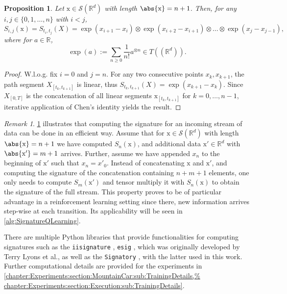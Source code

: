 \documentclass[
    a4paper,
    11pt,
    bibliography=totoc,
    listof=totoc,      
    headinclude=true,
    cleardoublepage=empty,
]{scrbook}
\theoremstyle{plain}
\newtheorem{proposition}[theorem]{Proposition}
\theoremstyle{definition}
\theoremstyle{remark}
\newtheorem{remark}[theorem]{Remark}
\newcommand{\SetR}{\mathbb R}
\begin{document}
\begin{proposition}
\label{prop:SignatureComputation}
    Let $\mathrm x\in\mathcal{S}(\SetR^d)$ with length $\abs{\mathrm x}
    =n+1$. Then, for any $i,j\in\{0,1,\dots,n\}$ with $i<j$,  
    \[
        S_{i,j}(\mathrm x) = S_{t_i,t_j}(X) 
        = \exp(x_{i+1}-x_i)\otimes\exp(x_{i+2}-x_{i+1})\otimes\dots
            \otimes\exp(x_j-x_{j-1}), 
    \]
    where for $a\in\SetR$,
    \[
        \exp(a):=\sum_{n\geq0} \frac{1}{n!} a^{\otimes n} \in T((\SetR^d)).
    \]
\end{proposition}
\begin{proof}
    W.l.o.g. fix $i=0$ and $j=n$. For any two consecutive points 
    $x_k,x_{k+1}$, the path segment $X_{[t_k,t_{k+1}]}$ is 
    linear, thus $S_{t_k,t_{k+1}}(X) = \exp(x_{k+1}-x_{k})$. 
    Since $X_{[0,T]}$ is the concatenation of all linear segments 
    $\bm{\mathrm x}_{[t_k,t_{k+1}]}$ for $k=0,\dots,n-1$, iterative 
    application of Chen's identity yields the result.
\end{proof}
\begin{remark}
    \cref{prop:SignatureComputation} illustrates that computing the signature
    for an incoming stream of data can be done in an efficient way. Assume
    that for $\mathrm{x}\in\mathcal{S}(\SetR^d)$ with length $\abs{\mathrm x}
    =n+1$ we have computed $S_{n}(\mathrm x)$, and additional data $\mathrm x' 
    \in\SetR^d$ with $\abs{\mathrm x'}=m+1$ arrives. Further, assume we have 
    appended $x_n$ to the beginning of $\mathrm x'$ such that $x_n = x'_0$. 
    Instead of concatenating $\mathrm x$ and $\mathrm x'$, and computing the 
    signature of the concatenation containing $n+m+1$ elements, one only needs 
    to compute $S_m(\mathrm x')$ and tensor multiply it with $S_n(\mathrm x)$ 
    to obtain the signature of the full stream. This property 
    proves to be of particular advantage in a reinforcement learning setting 
    since there, new information arrives step-wise at each transition. Its 
    applicability will be seen in \cref{alg:SignatureQLearning}.
\end{remark}

There are multiple Python libraries that provide functionalities for computing 
signatures such as the \texttt{iisignature}
\cite{reizenstein2020_a1ileciss}, \texttt{esig} \cite{lyons2002_esig}, which 
was originally developed by Terry Lyons et al., as well as the
\texttt{Signatory} \cite{kidger2021_sdcsltb}, with the latter used in this 
work. Further computational details are provided for the experiments in 
\cref{chapter:Experiments:section:MountainCar:sub:TrainingDetails,%
chapter:Experiments:section:Execution:sub:TrainingDetails}.
\end{document}
